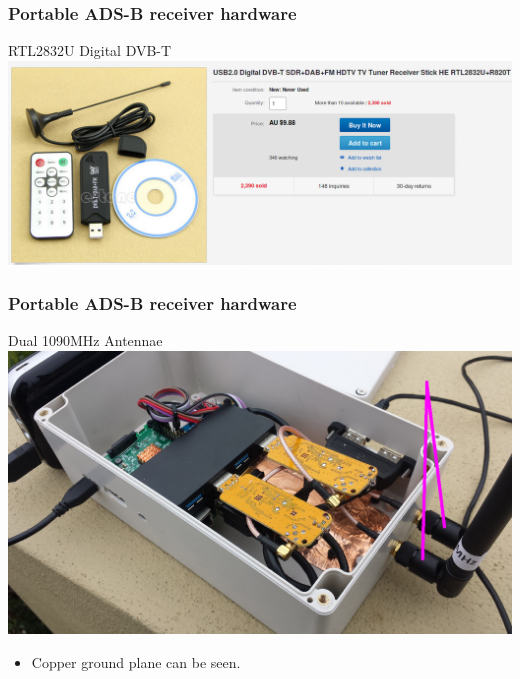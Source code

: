\begin{frame}
\frametitle{Portable ADS-B receiver hardware}
\begin{block}{RTL2832U Digital DVB-T}
\includegraphics[height=0.4\textheight]{image/ebay-dvb-tuner.png}
\end{block}
\end{frame}

\begin{frame}
\frametitle{Portable ADS-B receiver hardware}
\begin{block}{Dual 1090MHz Antennae}
\includegraphics[height=0.5\textheight]{image/adsb-hardware-antennae.png}
\begin{itemize}
\item Copper ground plane can be seen.
\end{itemize}
\end{block}
\end{frame}


